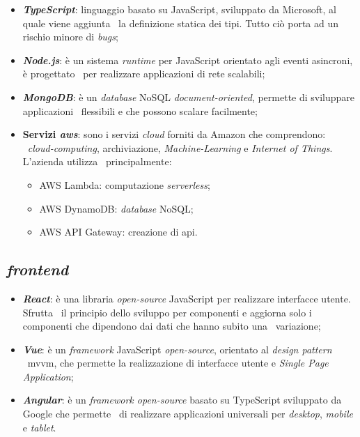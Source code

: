 \begin{itemize}
  \item \textbf{\emph{TypeScript}}: linguaggio basato su JavaScript, sviluppato da Microsoft, al quale viene aggiunta \
  la definizione statica dei tipi. Tutto ciò porta ad un rischio minore di \emph{bugs};
  \item \textbf{\emph{Node.js}}: è un sistema \emph{runtime} per JavaScript orientato agli eventi asincroni, è progettato \
  per realizzare applicazioni di rete scalabili;
  \item \textbf{\emph{MongoDB}}: è un \emph{database} NoSQL \emph{document-oriented}, permette di sviluppare applicazioni \
  flessibili e che possono scalare facilmente;
  \item \textbf{Servizi \emph{\acrfull{aws}}}: sono i servizi \emph{cloud} forniti da Amazon che comprendono: \
  \emph{cloud-computing}, archiviazione, \emph{Machine-Learning} e \emph{Internet of Things}. L'azienda utilizza \
  principalmente: 
  \begin{itemize}
    \item AWS Lambda: computazione \emph{serverless};
    \item AWS DynamoDB: \emph{database} NoSQL;
    \item AWS API Gateway: creazione di \acrshort{api}.
  \end{itemize}
\end{itemize}

\subsection{\emph{\Gls{frontend}}}

\begin{itemize}
  \item \textbf{\emph{React}}: è una libraria \emph{\gls{open-source}} JavaScript per realizzare interfacce utente. Sfrutta \
  il principio dello sviluppo per componenti e aggiorna solo i componenti che dipendono dai dati che hanno subito una \
  variazione;
  \item \textbf{\emph{Vue}}: è un \emph{framework} JavaScript \emph{open-source}, orientato al \emph{design pattern} \
  \acrshort{mvvm}, che permette la realizzazione di interfacce utente e \emph{Single Page Application};
  \item \textbf{\emph{Angular}}: è un \emph{framework open-source} basato su TypeScript sviluppato da Google che permette \
  di realizzare applicazioni universali per \emph{desktop}, \emph{mobile} e \emph{tablet}.
\end{itemize}

